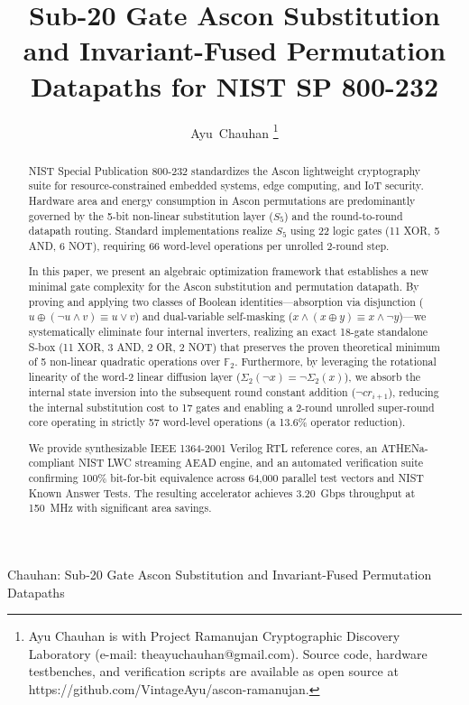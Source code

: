 \documentclass[journal,10pt]{IEEEtran}
\begin{document}
\title{Sub-20 Gate Ascon Substitution and Invariant-Fused Permutation Datapaths for NIST SP 800-232}

\author{Ayu~Chauhan%
\thanks{Ayu Chauhan is with Project Ramanujan Cryptographic Discovery Laboratory (e-mail: theayuchauhan@gmail.com). Source code, hardware testbenches, and verification scripts are available as open source at https://github.com/VintageAyu/ascon-ramanujan.}%
}

%
{Chauhan: Sub-20 Gate Ascon Substitution and Invariant-Fused Permutation Datapaths}

\maketitle

\begin{abstract}
NIST Special Publication 800-232 standardizes the Ascon lightweight cryptography suite for resource-constrained embedded systems, edge computing, and IoT security. Hardware area and energy consumption in Ascon permutations are predominantly governed by the 5-bit non-linear substitution layer ($S_5$) and the round-to-round datapath routing. Standard implementations realize $S_5$ using 22 logic gates (11 XOR, 5 AND, 6 NOT), requiring 66 word-level operations per unrolled 2-round step. 

In this paper, we present an algebraic optimization framework that establishes a new minimal gate complexity for the Ascon substitution and permutation datapath. By proving and applying two classes of Boolean identities---absorption via disjunction ($u \oplus (\neg u \land v) \equiv u \lor v$) and dual-variable self-masking ($x \land (x \oplus y) \equiv x \land \neg y$)---we systematically eliminate four internal inverters, realizing an exact 18-gate standalone S-box (11 XOR, 3 AND, 2 OR, 2 NOT) that preserves the proven theoretical minimum of 5 non-linear quadratic operations over $\mathbb{F}_2$. Furthermore, by leveraging the rotational linearity of the word-2 linear diffusion layer ($\Sigma_2(\neg x) = \neg \Sigma_2(x)$), we absorb the internal state inversion into the subsequent round constant addition ($\neg cr_{i+1}$), reducing the internal substitution cost to 17 gates and enabling a 2-round unrolled super-round core operating in strictly 57 word-level operations (a 13.6\% operator reduction). 

We provide synthesizable IEEE 1364-2001 Verilog RTL reference cores, an ATHENa-compliant NIST LWC streaming AEAD engine, and an automated verification suite confirming 100\% bit-for-bit equivalence across 64,000 parallel test vectors and NIST Known Answer Tests. The resulting accelerator achieves 3.20~Gbps throughput at 150~MHz with significant area savings.
\end{abstract}
\end{document}
